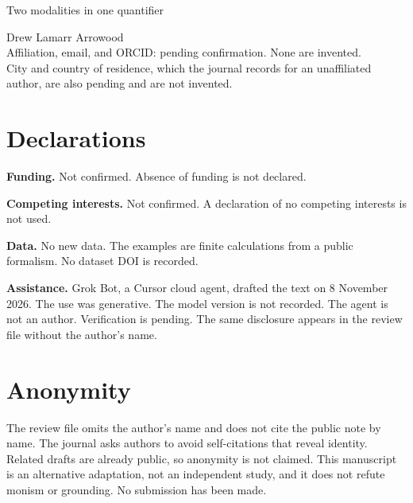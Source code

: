 \documentclass[11pt]{article}
\begin{document}
\begin{center}
{\Large Two modalities in one quantifier\par}
\vspace{0.8em}
Drew Lamarr Arrowood\\
Affiliation, email, and ORCID: pending confirmation. None are invented.\\
City and country of residence, which the journal records for an unaffiliated author, are also pending and are not invented.
\end{center}
\section*{Declarations}
\textbf{Funding.} Not confirmed. Absence of funding is not declared.

\textbf{Competing interests.} Not confirmed. A declaration of no competing interests is not used.

\textbf{Data.} No new data. The examples are finite calculations from a public formalism. No dataset DOI is recorded.

\textbf{Assistance.} Grok Bot, a Cursor cloud agent, drafted the text on 8 November 2026. The use was generative. The model version is not recorded. The agent is not an author. Verification is pending. The same disclosure appears in the review file without the author's name.

\section*{Anonymity}
The review file omits the author's name and does not cite the public note by name. The journal asks authors to avoid self-citations that reveal identity. Related drafts are already public, so anonymity is not claimed. This manuscript is an alternative adaptation, not an independent study, and it does not refute monism or grounding. No submission has been made.
\end{document}
